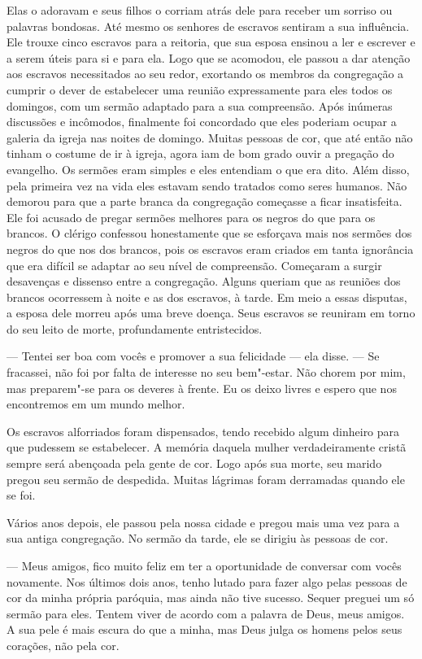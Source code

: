 Elas o adoravam e seus filhos o corriam atrás dele para receber um
sorriso ou palavras bondosas. Até mesmo os senhores de escravos sentiram
a sua influência. Ele trouxe cinco escravos para a reitoria, que sua
esposa ensinou a ler e escrever e a serem úteis para si e para ela. Logo
que se acomodou, ele passou a dar atenção aos escravos necessitados ao
seu redor, exortando os membros da congregação a cumprir o dever de
estabelecer uma reunião expressamente para eles todos os domingos, com
um sermão adaptado para a sua compreensão. Após inúmeras discussões e
incômodos, finalmente foi concordado que eles poderiam ocupar a galeria
da igreja nas noites de domingo. Muitas pessoas de cor, que até então
não tinham o costume de ir à igreja, agora iam de bom grado ouvir a
pregação do evangelho. Os sermões eram simples e eles entendiam o que
era dito. Além disso, pela primeira vez na vida eles estavam sendo
tratados como seres humanos. Não demorou para que a parte branca da
congregação começasse a ficar insatisfeita. Ele foi acusado de pregar
sermões melhores para os negros do que para os brancos. O clérigo
confessou honestamente que se esforçava mais nos sermões dos negros do
que nos dos brancos, pois os escravos eram criados em tanta ignorância
que era difícil se adaptar ao seu nível de compreensão. Começaram a
surgir desavenças e dissenso entre a congregação. Alguns queriam que as
reuniões dos brancos ocorressem à noite e as dos escravos, à tarde. Em
meio a essas disputas, a esposa dele morreu após uma breve doença. Seus
escravos se reuniram em torno do seu leito de morte, profundamente
entristecidos.

--- Tentei ser boa com vocês e promover a sua felicidade --- ela disse.
--- Se fracassei, não foi por falta de interesse no seu bem"-estar. Não
chorem por mim, mas preparem"-se para os deveres à frente. Eu os deixo
livres e espero que nos encontremos em um mundo melhor.

Os escravos alforriados foram dispensados, tendo recebido algum dinheiro
para que pudessem se estabelecer. A memória daquela mulher
verdadeiramente cristã sempre será abençoada pela gente de cor. Logo
após sua morte, seu marido pregou seu sermão de despedida. Muitas
lágrimas foram derramadas quando ele se foi.

Vários anos depois, ele passou pela
nossa cidade e pregou mais uma vez para a sua antiga congregação. No
sermão da tarde, ele se dirigiu às pessoas de cor.

--- Meus amigos, fico muito feliz em ter a oportunidade de conversar com
vocês novamente. Nos últimos dois anos, tenho lutado para fazer algo
pelas pessoas de cor da minha própria paróquia, mas ainda não tive
sucesso. Sequer preguei um só sermão para eles. Tentem viver de acordo
com a palavra de Deus, meus amigos. A sua pele é mais escura do que a
minha, mas Deus julga os homens pelos seus corações, não pela cor.

